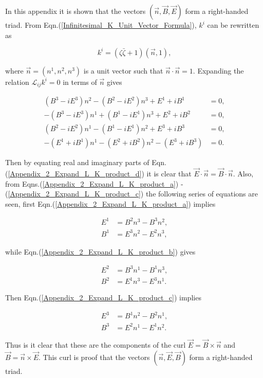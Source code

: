 \begin{appendix}
In this appendix it is shown that the vectors $(\vec{n}, \vec{B}, \vec{E})$ form a right-handed triad. From Eqn.(\ref{Infinitesimal_K_Unit_Vector_Formula}), $k^i$ can be rewritten as

\begin{equation*}
k^i = (\zeta \bar{\zeta} + 1)(\vec{n}, 1),
\end{equation*}

\noindent where $\vec{n} = (n^1, n^2, n^3)$ is a unit vector such that $\vec{n} \cdot \vec{n} = 1$. Expanding the relation $\mathcal{L}_{ij} k^i = 0$ in terms of $\vec{n}$ gives

\begin{subequations}
\begin{align}
\label{Appendix_2_Expand_L_K_product_a}
(B^3 - i E^3)n^2 - (B^2 - i E^2)n^3 + E^1 + iB^1 & = 0, 
\\\label{Appendix_2_Expand_L_K_product_b}
-(B^3 - i E^3)n^1 + (B^1 - i E^1)n^3 + E^2 + iB^2 & = 0, 
\\\label{Appendix_2_Expand_L_K_product_c}
(B^2 - i E^2)n^1 - (B^1 - i E^1)n^2 + E^3 + iB^3 & = 0, 
\\\label{Appendix_2_Expand_L_K_product_d}
-(E^1 + i B^1)n^1 - (E^2 + iB^2)n^2 - (E^3 + iB^3) & = 0.
\end{align}
\end{subequations}

\noindent Then by equating real and imaginary parts of Eqn.(\ref{Appendix_2_Expand_L_K_product_d}) it is clear that  $\vec{E} \cdot \vec{n} = \vec{B} \cdot \vec{n}$. Also, from Eqns.(\ref{Appendix_2_Expand_L_K_product_a}) - (\ref{Appendix_2_Expand_L_K_product_c}) the following series of equations are seen, first Eqn.(\ref{Appendix_2_Expand_L_K_product_a}) implies

\begin{align*}
E^1 & = B^2 n^3 - B^3 n^2, \\
B^1 & = E^3 n^2 - E^2 n^3, 
\end{align*}

\noindent while Eqn.(\ref{Appendix_2_Expand_L_K_product_b}) gives

\begin{align*} 
E^2 & = B^3 n^1 - B^1n^3, \\
B^2 & = E^1 n^3 - E^3 n^1.
\end{align*} 

\noindent Then Eqn.(\ref{Appendix_2_Expand_L_K_product_c}) implies

\begin{align*}
E^3 & = B^1 n^2 - B^2 n^1,\\
B^3 & = E^2 n^1 - E^1 n^2.
\end{align*}

\noindent Thus is it clear that these are the components of the curl $\vec{E} = \vec{B} \times \vec{n}$ and $\vec{B} = \vec{n} \times \vec{E}$. This curl is proof that the vectors $(\vec{n}, \vec{E}, \vec{B})$ form a right-handed triad. 




\end{appendix}
